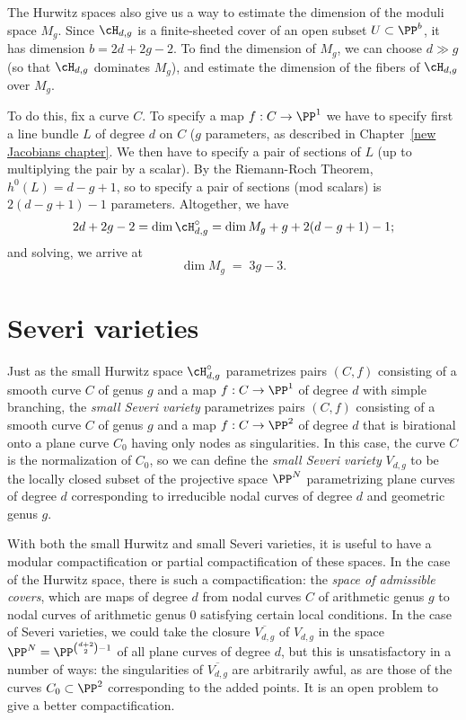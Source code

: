The Hurwitz spaces also give us a way to estimate the dimension of the moduli space $M_g$. Since $\cH_{d,g}$ is a finite-sheeted cover of an open subset $U \subset \PP^b$, it has dimension  $b = 2d+2g-2$. 
To find the dimension of $M_g$, we can choose $d \gg g$ (so that $\cH_{d,g}$ dominates $M_g$), and estimate the dimension of the fibers of $\cH_{d,g}$ over $M_g$.

To do this, fix a curve $C$. To specify a map $f : C \to \PP^1$ we have to specify first a line bundle $L$ of degree $d$ on $C$ ($g$ parameters, as described in Chapter~\ref{new Jacobians chapter}. We then have to specify a pair of sections of $L$ (up to multiplying the pair by a scalar). By the Riemann-Roch Theorem, $h^0(L) = d-g+1$, so to specify a pair of sections (mod scalars) is $2(d-g+1)-1$ parameters. Altogether, we have
$$
2d+2g-2 = \dim \cH^\circ_{d,g} = \dim M_g + g + 2(d-g+1)-1;
$$
and solving, we arrive at
$$
\dim M_g \; = \; 3g-3.
$$

\section{Severi varieties}


Just as the small Hurwitz space $\cH^\circ_{d,g}$ parametrizes pairs $(C,f)$ consisting of a smooth curve $C$ of genus $g$ and a map $f : C \to \PP^1$ of degree $d$
with simple branching, the \emph{small Severi variety} parametrizes pairs $(C,f)$ consisting of a smooth curve $C$ of genus $g$ and a map $f : C \to \PP^2$ of degree $d$ that is birational onto a plane curve $C_0$ having only nodes as singularities. In this case, the curve $C$ is the normalization of $C_0$, so we can define the \emph{small Severi variety} $V_{d,g}$ to be the locally closed subset of the projective space $\PP^N$ parametrizing plane curves of degree $d$ corresponding to irreducible nodal curves of degree $d$ and geometric genus $g$.

With both the small Hurwitz and small Severi varieties, it is useful to have a modular compactification or partial compactification of these spaces. In the case of the Hurwitz space, there is such a compactification: the \emph{space of admissible covers}, which are  maps of degree $d$ from nodal curves $C$ of arithmetic genus $g$ to nodal curves of arithmetic genus 0 satisfying certain local conditions. In the case of Severi varieties, we could take the closure $\overline{V_{d,g}}$ of $V_{d,g}$ in the space $\PP^N = \PP^{\binom{d+2}{2}-1}$ of all plane curves of degree $d$, but this is unsatisfactory in a number of ways: the singularities of $\overline{V_{d,g}}$ are arbitrarily awful, as are those of the curves $C_0 \subset \PP^2$ corresponding to the added points. It is an open problem to give a better compactification.


